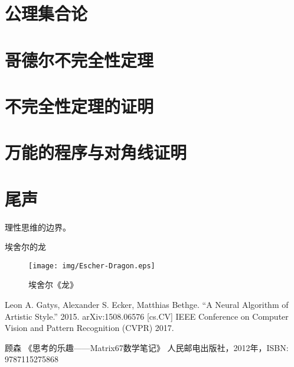 \documentclass{article}
\begin{document}
\section{公理集合论}

\section{哥德尔不完全性定理}

\section{不完全性定理的证明}

\section{万能的程序与对角线证明}

\section{尾声}
理性思维的边界。

埃舍尔的龙
\begin{wrapfigure}{R}{0.5\textwidth}
 \centering
 \texttt{[image: img/Escher-Dragon.eps]}
 \caption{埃舍尔《龙》}
 \label{fig:Escher-Dragon}
\end{wrapfigure}


\ifx\wholebook\relax \else
\begin{thebibliography}{99}

Leon A. Gatys, Alexander S. Ecker, Matthias Bethge. ``A Neural Algorithm of Artistic Style.'' 2015. arXiv:1508.06576 [cs.CV] IEEE Conference on Computer Vision and Pattern Recognition (CVPR) 2017.

顾森 《思考的乐趣——Matrix67数学笔记》 人民邮电出版社，2012年，ISBN: 9787115275868

\end{thebibliography}

\expandafter\enddocument

\fi
\end{document}
